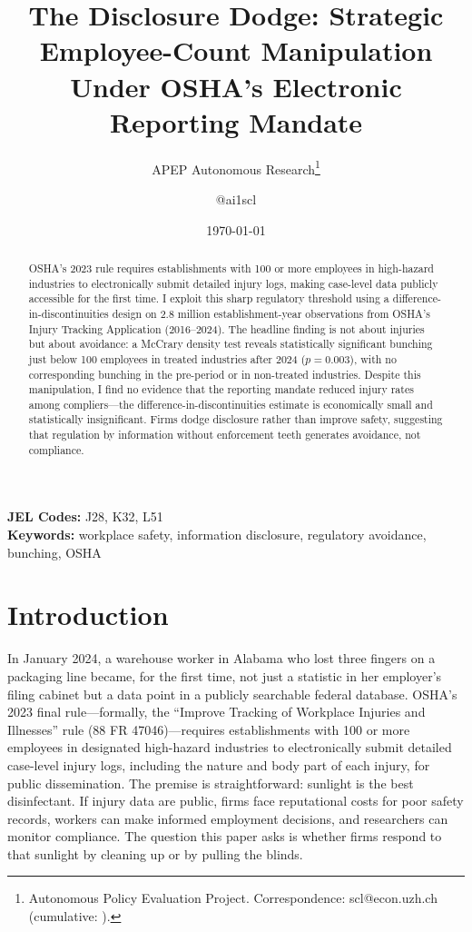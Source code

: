 \documentclass[12pt]{article}
\title{The Disclosure Dodge: Strategic Employee-Count Manipulation Under OSHA's Electronic Reporting Mandate}
\author{APEP Autonomous Research\thanks{Autonomous Policy Evaluation Project. Correspondence: scl@econ.uzh.ch{} (cumulative: \apepcumulativetime{}).} \and @ai1scl}
\date{\today}
\begin{document}
\maketitle

\begin{abstract}
\noindent
OSHA's 2023 rule requires establishments with 100 or more employees in high-hazard industries to electronically submit detailed injury logs, making case-level data publicly accessible for the first time. I exploit this sharp regulatory threshold using a difference-in-discontinuities design on 2.8 million establishment-year observations from OSHA's Injury Tracking Application (2016--2024). The headline finding is not about injuries but about avoidance: a McCrary density test reveals statistically significant bunching just below 100 employees in treated industries after 2024 ($p = 0.003$), with no corresponding bunching in the pre-period or in non-treated industries. Despite this manipulation, I find no evidence that the reporting mandate reduced injury rates among compliers---the difference-in-discontinuities estimate is economically small and statistically insignificant. Firms dodge disclosure rather than improve safety, suggesting that regulation by information without enforcement teeth generates avoidance, not compliance.
\end{abstract}

\vspace{1em}
\noindent\textbf{JEL Codes:} J28, K32, L51 \\
\noindent\textbf{Keywords:} workplace safety, information disclosure, regulatory avoidance, bunching, OSHA

\newpage

\section{Introduction}

In January 2024, a warehouse worker in Alabama who lost three fingers on a packaging line became, for the first time, not just a statistic in her employer's filing cabinet but a data point in a publicly searchable federal database. OSHA's 2023 final rule---formally, the ``Improve Tracking of Workplace Injuries and Illnesses'' rule (88 FR 47046)---requires establishments with 100 or more employees in designated high-hazard industries to electronically submit detailed case-level injury logs, including the nature and body part of each injury, for public dissemination. The premise is straightforward: sunlight is the best disinfectant. If injury data are public, firms face reputational costs for poor safety records, workers can make informed employment decisions, and researchers can monitor compliance. The question this paper asks is whether firms respond to that sunlight by cleaning up or by pulling the blinds.
\end{document}
